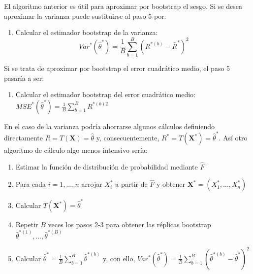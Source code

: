 \documentclass[
]{book}
\providecommand{\tightlist}{%
  \setlength{\itemsep}{0pt}\setlength{\parskip}{0pt}}
\theoremstyle{break}
\theoremstyle{definition}
\theoremstyle{definition}
\theoremstyle{definition}
\theoremstyle{definition}
\theoremstyle{remark}
\begin{document}
El algoritmo anterior es útil para aproximar por bootstrap el sesgo. Si
se desea aproximar la varianza puede sustituirse al paso 5 por:

\begin{enumerate}
\def\labelenumi{\arabic{enumi}.}
\setcounter{enumi}{4}
\tightlist
\item
  Calcular el estimador bootstrap de la varianza:
  \[Var^{\ast}\left( \hat{\theta}^{\ast} \right) =\frac{1}{B}
  \sum_{b=1}^{B}\left( R^{\ast (b)}-\bar{R}^{\ast} \right)^2\]
\end{enumerate}

Si se trata de aproximar por bootstrap el error cuadrático medio, el
paso 5 pasaría a ser:

\begin{enumerate}
\def\labelenumi{\arabic{enumi}.}
\setcounter{enumi}{4}
\tightlist
\item
  Calcular el estimador bootstrap del error cuadrático medio:
  \(MSE^{\ast}\left( \hat{\theta}^{\ast} \right) =\frac{1}{B}\sum_{b=1}^{B}R^{\ast (b) 2}\)
\end{enumerate}

En el caso de la varianza podría ahorrarse algunos cálculos definiendo
directamente \(R=T\left( \mathbf{X} \right) =\hat{\theta}\) y,
consecuentemente,
\(R^{\ast}=T\left( \mathbf{X}^{\ast} \right) = \hat{\theta}^{\ast}\). Así otro algoritmo de cálculo algo menos
intensivo sería:

\begin{enumerate}
\def\labelenumi{\arabic{enumi}.}
\item
  Estimar la función de distribución de probabilidad mediante \(\hat{ F}\)
\item
  Para cada \(i=1,\ldots ,n\) arrojar \(X_i^{\ast}\) a partir de
  \(\hat{F}\) y obtener
  \(\mathbf{X}^{\ast}=\left( X_1^{\ast}, \ldots, X_n^{\ast} \right)\)
\item
  Calcular
  \(T\left( \mathbf{X}^{\ast} \right) = \hat{\theta}^{\ast}\)
\item
  Repetir \(B\) veces los pasos 2-3 para obtener las réplicas bootstrap
  \(\hat{\theta}^{\ast (1)}, \ldots, \hat{\theta}^{\ast(B)}\)
\item
  Calcular
  \(\overline{\hat{\theta}^{\ast}}=\frac{1}{B}\sum_{b=1}^{B}\hat{ \theta}^{\ast (b)}\) y, con ello,
  \(Var^{\ast}\left( \hat{\theta}^{\ast} \right) =\frac{1}{B}\sum_{b=1}^{B}\left( \hat{\theta}^{\ast \left(b \right)}-\overline{\hat{\theta}^{\ast}} \right)^2\)
\end{enumerate}
\end{document}
